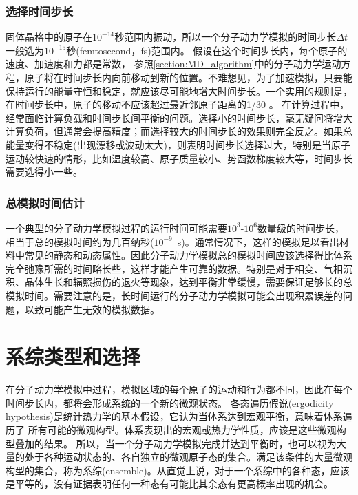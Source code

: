 \subsubsection{选择时间步长}
固体晶格中的原子在$10^{-14}$秒范围内振动，所以一个分子动力学模拟的时间步长$\Delta t$一般选为$10^{-15}$秒\textrm{(femtosecond，fs)}范围内。%
假设在这个时间步长内，每个原子的速度、加速度和力都是常数，%
参照\ref{section:MD_algorithm}中的分子动力学运动方程，原子将在时间步长内向前移动到新的位置。不难想见，为了加速模拟，只要能保持运行的能量守恒和稳定，就应该尽可能地增大时间步长。一个实用的规则是，在时间步长中，原子的移动不应该超过最近邻原子距离的1/30%
。
在计算过程中，经常面临计算负载和时间步长间平衡的问题。选择小的时间步长，毫无疑问将增大计算负荷，但通常会提高精度；而选择较大的时间步长的效果则完全反之。如果总能量变得不稳定(出现漂移或波动太大)，则表明时间步长选择过大，特别是当原子运动较快速的情形，比如温度较高、原子质量较小、势函数梯度较大等，时间步长需要选得小一些。

\subsubsection{总模拟时间估计}
一个典型的分子动力学模拟过程的运行时间可能需要$10^3$-$10^6$数量级的时间步长，相当于总的模拟时间约为几百纳秒($10^{-9}$~\textrm{s})。通常情况下，这样的模拟足以看出材料中常见的静态和动态属性。因此分子动力学模拟总的模拟时间应该选择得比体系完全弛豫所需的时间略长些，这样才能产生可靠的数据。特别是对于相变、气相沉积、晶体生长和辐照损伤的退火等现象，达到平衡非常缓慢，需要保证足够长的总模拟时间。需要注意的是，长时间运行的分子动力学模拟可能会出现积累误差的问题，以致可能产生无效的模拟数据。

\section{系综类型和选择}\label{sec:ensemble}
在分子动力学模拟中过程，模拟区域的每个原子的运动和行为都不同，因此在每个时间步长内，都将会形成系统的一个新的微观状态。
各态遍历假说\textrm{(ergodicity hypothesis)}是统计热力学的基本假设，它认为当体系达到宏观平衡，意味着体系遍历了%
所有可能的微观构型。体系表现出的宏观或热力学性质，应该是这些微观构型叠加的结果。%
所以，当一个分子动力学模拟完成并达到平衡时，也可以视为大量的处于各种运动状态的、各自独立的微观原子态的集合。满足该条件的大量微观构型的集合，称为系综\textrm{(ensemble)}。从直觉上说，对于一个系综中的各种态，应该是平等的，没有证据表明任何一种态有可能比其余态有更高概率出现的机会。

